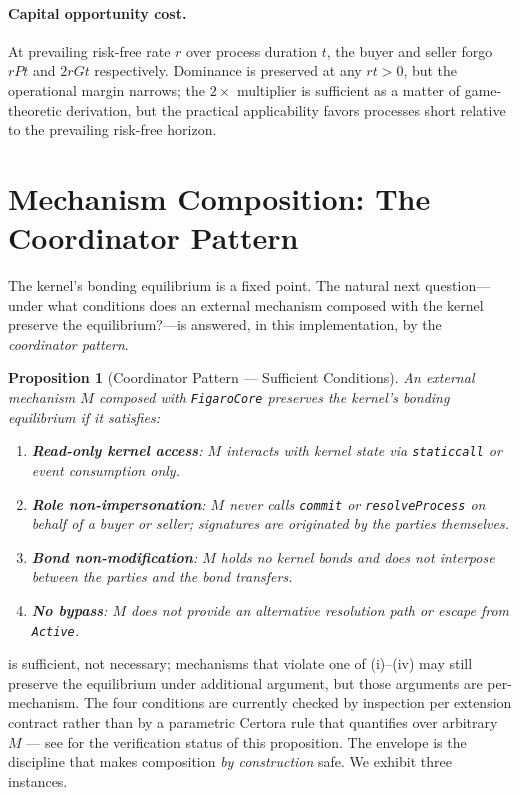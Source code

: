 \documentclass[11pt,a4paper]{article}
\newtheorem{proposition}[theorem]{Proposition}
\theoremstyle{definition}
\theoremstyle{remark}
\newcommand{\pay}{P}
\newcommand{\cumval}{G}
\begin{document}
\paragraph{Capital opportunity cost.}
At prevailing risk-free rate $r$ over process duration $t$, the
buyer and seller forgo $r\pay t$ and $2r\cumval t$ respectively.
Dominance is preserved at any $rt > 0$, but the operational margin
narrows; the $2\times$ multiplier is sufficient as a matter of
game-theoretic derivation, but the practical applicability favors
processes short relative to the prevailing risk-free horizon.

\section{Mechanism Composition: The Coordinator Pattern}
\label{sec:composition}

The kernel's bonding equilibrium is a fixed point. The natural next
question---under what conditions does an external mechanism composed
with the kernel preserve the equilibrium?---is answered, in this
implementation, by the \emph{coordinator pattern}.

\begin{proposition}[Coordinator Pattern --- Sufficient Conditions]
\label{prop:coordinator}
An external mechanism $M$ composed with \texttt{FigaroCore} preserves
the kernel's bonding equilibrium if it satisfies:
\begin{enumerate}[label=(\roman*)]
  \item \textbf{Read-only kernel access}: $M$ interacts with kernel
    state via \texttt{staticcall} or event consumption only.
  \item \textbf{Role non-impersonation}: $M$ never calls
    \texttt{commit} or \texttt{resolveProcess} on behalf of a buyer
    or seller; signatures are originated by the parties themselves.
  \item \textbf{Bond non-modification}: $M$ holds no kernel bonds
    and does not interpose between the parties and the bond
    transfers.
  \item \textbf{No bypass}: $M$ does not provide an alternative
    resolution path or escape from \texttt{Active}.
\end{enumerate}
\end{proposition}

 is sufficient, not necessary; mechanisms
that violate one of (i)--(iv) may still preserve the equilibrium
under additional argument, but those arguments are per-mechanism.
The four conditions are currently checked by inspection per
extension contract rather than by a parametric Certora rule that
quantifies over arbitrary $M$ --- see  for the
verification status of this proposition. The envelope is the
discipline that makes composition \emph{by construction} safe.
We exhibit three instances.
\end{document}
